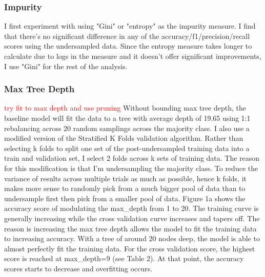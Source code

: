 \documentclass{article}
\newcommand\todo[1]{\textcolor{red}{#1}}
\begin{document}
\subsubsection*{Impurity}
I first experiment with using "Gini" or "entropy" as the impurity measure. I find that there's no significant difference in any of the accuracy/f1/precision/recall scores using the undersampled data. Since the entropy measure takes longer to calculate due to logs in the measure and it doesn't offer significant improvements, I use "Gini" for the rest of the analysis.


\subsubsection*{Max Tree Depth}
\todo{ try fit to max depth and use pruning}
Without bounding max tree depth, the baseline model will fit the data to a tree with average depth of 19.65 using 1:1 rebalancing across 20 random samplings across the majority class. I also use a modified version of the Stratified K Folds validation algorithm. Rather than selecting k folds to split one set of the post-undersampled training data into a train and validation set, I select 2 folds across k sets of training data. The reason for this modification is that I'm undersampling the majority class. To reduce the variance of results across multiple trials as much as possible, hence k folds, it makes more sense to randomly pick from a much bigger pool of data than to undersample first then pick from a smaller pool of data. 
Figure 1a shows the accuracy score of modulating the max\_depth from 1 to 20. The training curve is generally increasing while the cross validation curve increases and tapers off. The reason is increasing the max tree depth allows the model to fit the training data to increasing accuracy. With a tree of around 20 nodes deep, the model is able to almost perfectly fit the training data. For the cross validation score, the highest score is reached at max\_depth=9 (see Table 2). At that point, the accuracy scores starts to decrease and overfitting occurs. 
\end{document}
